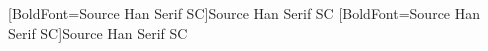 \usepackage{fancyhdr}
\pagestyle{fancy}
\fancyfoot{}
\usepackage{xeCJK}
\usepackage[top=1in, bottom=1in, left=1.25in, right=1.25in]{geometry}
[BoldFont=Source Han Serif SC]{Source Han Serif SC}
[BoldFont=Source Han Serif SC]{Source Han Serif SC}

